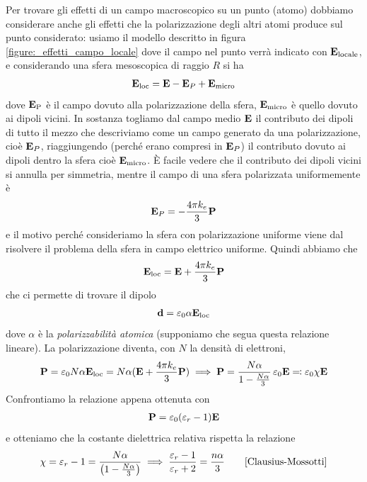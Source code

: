 Per trovare gli effetti di un campo macroscopico su un punto (atomo) dobbiamo considerare anche gli effetti che la polarizzazione degli altri atomi produce 
sul punto considerato: usiamo il modello descritto in figura \ref{figure:_effetti_campo_locale} dove il campo nel punto verrà indicato 
con $ \mathbf{E}_{\text{locale}} $, e considerando una sfera mesoscopica di raggio $ R $ si ha 
\begin{align}
  \mathbf{E}_{\text{loc}} = \mathbf{E} - \mathbf{E}_P + \mathbf{E}_{\text{micro}}
\end{align}
dove $ \mathbf{E}_{\text{P}} $ è il campo dovuto alla polarizzazione della sfera, $ \mathbf{E}_{\text{micro}} $ è quello dovuto ai dipoli vicini. 
In sostanza togliamo dal campo medio $ \mathbf{E} $ il contributo dei dipoli di tutto il mezzo che descriviamo come un campo generato da una polarizzazione, cioè 
$ \mathbf{E}_P $, riaggiungendo (perché erano compresi in $ \mathbf{E}_P $) il contributo dovuto ai dipoli dentro la sfera cioè $ \mathbf{E}_{\text{micro}} $.
È facile vedere che il contributo dei dipoli vicini si annulla per simmetria, mentre il campo di una sfera polarizzata uniformemente è
\begin{align}
  \mathbf{E}_P = - \frac{4\pi k_e}{3} \mathbf{P}
\end{align}
e il motivo perché consideriamo la sfera con polarizzazione uniforme viene dal risolvere il problema della sfera in campo elettrico uniforme. Quindi 
abbiamo che 
\begin{align}
  \mathbf{E}_{\text{loc}} = \mathbf{E} + \frac{4\pi k_e}{3} \mathbf{P}
\end{align}
che ci permette di trovare il dipolo 
\begin{align}
  \mathbf{d} = \varepsilon_0 \alpha \mathbf{E}_{\text{loc}}
\end{align}
dove $ \alpha $ è la \textit{polarizzabilità atomica} (supponiamo che segua questa relazione lineare). La polarizzazione diventa, con $ N $ la densità di 
elettroni,
\begin{align}
  \mathbf{P} = \varepsilon_0 N \alpha \mathbf{E}_{\text{loc}} = N\alpha (\mathbf{E} + \frac{4\pi k_e}{3} \mathbf{P}) 
  \implies \mathbf{P} = \frac{N \alpha}{1 - \frac{N \alpha}{3} }\, \varepsilon_0 \mathbf{E} \eqcolon \varepsilon_0 \chi \mathbf{E}
\end{align}
Confrontiamo la relazione appena ottenuta con 
\begin{align}
  \mathbf{P} = \varepsilon_0 (\varepsilon_r - 1)\mathbf{E}
\end{align}
e otteniamo che la costante dielettrica relativa rispetta la relazione
\begin{align}
  \chi = \varepsilon_r - 1 = \frac{N \alpha}{ \left( 1 - \frac{ N \alpha}{3} \right)} \implies \frac{\varepsilon_r - 1}{\varepsilon_r + 2} = \frac{n\alpha}{3}
  \tag*{[Clausius-Mossotti]}
\end{align}
